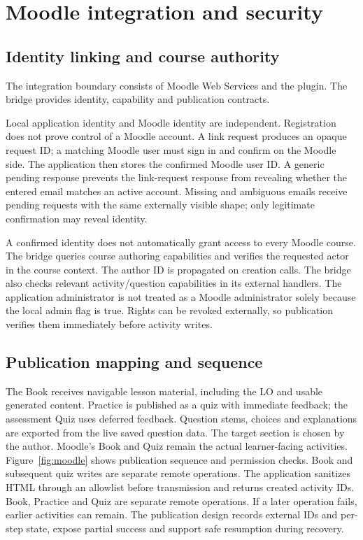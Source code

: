 \clearpage\section{Moodle integration and security}\label{sec:security}
\subsection{Identity linking and course authority}
The integration boundary consists of Moodle Web Services\citep{moodlews} and the  plugin. The bridge provides identity, capability and publication contracts.

Local application identity and Moodle identity are independent. Registration does not prove control of a Moodle account. A link request produces an opaque request ID; a matching Moodle user must sign in and confirm on the Moodle side. The application then stores the confirmed Moodle user ID. A generic pending response prevents the link-request response from revealing whether the entered email matches an active account. Missing and ambiguous emails receive pending requests with the same externally visible shape; only legitimate confirmation may reveal identity.

A confirmed identity does not automatically grant access to every Moodle course. The bridge queries course authoring capabilities and verifies the requested actor in the course context. The author ID is propagated on creation calls. The bridge also checks relevant activity/question capabilities in its external handlers. The application administrator is not treated as a Moodle administrator solely because the local admin flag is true. Rights can be revoked externally, so publication verifies them immediately before activity writes.
\subsection{Publication mapping and sequence}
The Book receives navigable lesson material, including the LO and usable generated content. Practice is published as a quiz with immediate feedback; the assessment Quiz uses deferred feedback. Question stems, choices and explanations are exported from the live saved question data. The target section is chosen by the author. Moodle's Book and Quiz remain the actual learner-facing activities\citep{moodlebook,moodlequiz}.
Figure~\ref{fig:moodle} shows publication sequence and permission checks. Book and subsequent quiz writes are separate remote operations.
The application sanitizes HTML through an allowlist before transmission and returns created activity IDs. Book, Practice and Quiz are separate remote operations. If a later operation fails, earlier activities can remain. The publication design records external IDs and per-step state, expose partial success and support safe resumption during recovery.
